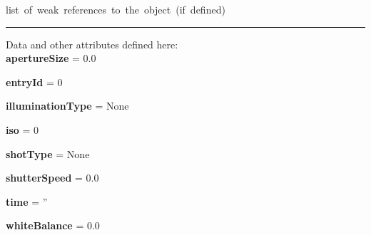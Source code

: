 \begin{longtable}[]
\begin{minipage}[t]{\linewidth}
\begin{longtable}[]
\begin{minipage}[t]{\linewidth}
\begin{description}
\tightlist
\item[\textbf{\_\_weakref\_\_}]
{list~of~weak~references~to~the~object~(if~defined)}
\end{description}

\begin{center}\rule{0.5\linewidth}{0.5pt}\end{center}

Data and other attributes defined here:\\

\textbf{apertureSize} = 0.0

\textbf{entryId} = 0

\textbf{illuminationType} = None

\textbf{iso} = 0

\textbf{shotType} = None

\textbf{shutterSpeed} = 0.0

\textbf{time} = ''

\textbf{whiteBalance} = 0.0\strut
\end{minipage} \\
\bottomrule
\end{longtable}


\end{minipage}
\end{longtable}
